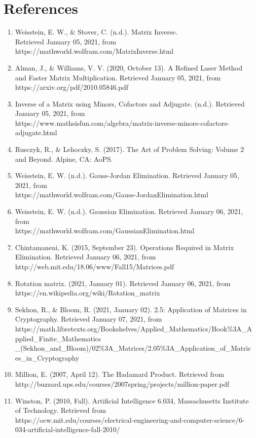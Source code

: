 \documentclass{article}
\begin{document}
\section*{References}
\begin{enumerate}[leftmargin=!,labelindent=5pt,itemindent=-15pt]
    \item Weisstein, E. W., \& Stover, C. (n.d.). Matrix Inverse. \\ Retrieved January 05, 2021, from https://mathworld.wolfram.com/MatrixInverse.html
    \item Alman, J., \& Williams, V. V. (2020, October 13). A Refined Laser Method and Faster Matrix Multiplication. Retrieved January 05, 2021, from https://arxiv.org/pdf/2010.05846.pdf
    \item Inverse of a Matrix using Minors, Cofactors and Adjugate. (n.d.). Retrieved January 05, 2021, from \\ https://www.mathsisfun.com/algebra/matrix-inverse-minors-cofactors-adjugate.html
    \item Rusczyk, R., \& Lehoczky, S. (2017). The Art of Problem Solving: Volume 2 and Beyond. Alpine, CA: AoPS.
    \item Weisstein, E. W. (n.d.). Gauss-Jordan Elimination. Retrieved January 05, 2021, from \\ https://mathworld.wolfram.com/Gauss-JordanElimination.html
    \item Weisstein, E. W. (n.d.). Gaussian Elimination. Retrieved January 06, 2021, from \\ https://mathworld.wolfram.com/GaussianElimination.html
    \item Chintamaneni, K. (2015, September 23). Operations Required in Matrix Elimination. Retrieved January 06, 2021, from http://web.mit.edu/18.06/www/Fall15/Matrices.pdf
    \item Rotation matrix. (2021, January 01). Retrieved January 06, 2021, from https://en.wikipedia.org/wiki/Rotation\_matrix
    \item Sekhon, R., \& Bloom, R. (2021, January 02). 2.5: Application of Matrices in Cryptography. Retrieved January 07, 2021, from\\ https://math.libretexts.org/Bookshelves/Applied\_Mathematics/Book\%3A\_Applied\_Finite\_Mathematics\\\_(Sekhon\_and\_Bloom)/02\%3A\_Matrices/2.05\%3A\_Application\_of\_Matrices\_in\_Cryptography
    \item Million, E. (2007, April 12). The Hadamard Product. Retrieved from       
\\ http://buzzard.ups.edu/courses/2007spring/projects/million-paper.pdf
    \item Winston, P. (2010, Fall). Artificial Intelligence 6.034, Massachusetts Institute of Technology. Retrieved from \\ https://ocw.mit.edu/courses/electrical-engineering-and-computer-science/6-034-artificial-intelligence-fall-2010/ 
    

\end{enumerate}
\end{document}
